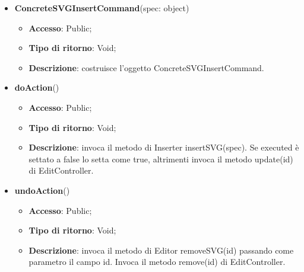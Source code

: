 {{{	
	\begin{itemize}
		\item \textbf{ConcreteSVGInsertCommand}(spec: object)
		\begin{itemize}
			\item \textbf{Accesso}: Public;
			\item \textbf{Tipo di ritorno}: Void;
			\item \textbf{Descrizione}: costruisce l’oggetto ConcreteSVGInsertCommand.
		\end{itemize}
		\item \textbf{doAction}()
		\begin{itemize}
			\item \textbf{Accesso}: Public;
			\item \textbf{Tipo di ritorno}: Void;
			\item \textbf{Descrizione}: invoca il metodo di Inserter insertSVG(spec). Se executed è settato a false lo setta come true, altrimenti invoca il metodo update(id) di EditController.
		\end{itemize}
		\item \textbf{undoAction}()
		\begin{itemize}
			\item \textbf{Accesso}: Public;
			\item \textbf{Tipo di ritorno}: Void;
			\item \textbf{Descrizione}: invoca il metodo di Editor removeSVG(id) passando come parametro il campo id. Invoca il metodo remove(id) di EditController.
		\end{itemize}
	\end{itemize}
	}

}}
